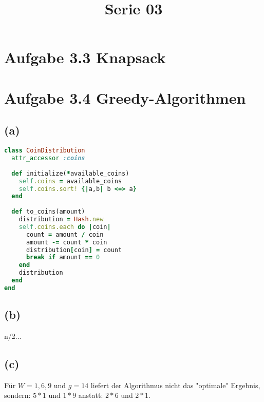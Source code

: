  
\title{Serie 03}

 
\section*{Aufgabe 3.3 Knapsack}

\section*{Aufgabe 3.4 Greedy-Algorithmen}

\subsection*{(a)}

\begin{lstlisting}[language=Ruby,numbers=right]
class CoinDistribution
  attr_accessor :coins
  
  def initialize(*available_coins)
    self.coins = available_coins
    self.coins.sort! {|a,b| b <=> a}
  end
  
  def to_coins(amount)
    distribution = Hash.new
    self.coins.each do |coin|
      count = amount / coin
      amount -= count * coin
      distribution[coin] = count
      break if amount == 0
    end
    distribution
  end
end  
\end{lstlisting}

\subsection*{(b)}

n/2...

\subsection*{(c)}

Für $W = {1,6,9}$ und $g = 14$ liefert der Algorithmus nicht das "optimale" Ergebnis, sondern: $5 * 1$ und $1 * 9$ anstatt: $2 * 6$ und $2 * 1$.



